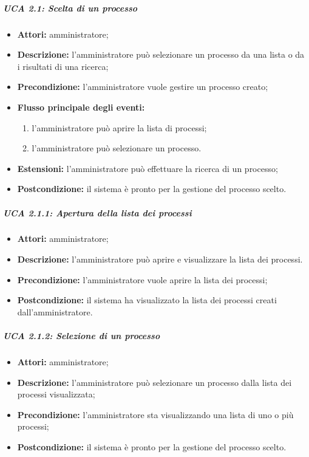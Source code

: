 \subparagraph{UCA 2.1: Scelta di un processo}
\begin{itemize}
\item \textbf{Attori:} amministratore;
\item \textbf{Descrizione:} l'amministratore può selezionare un processo da una lista o da i risultati di una ricerca;
\item \textbf{Precondizione:} l'amministratore vuole gestire un processo creato;
\item \textbf{Flusso principale degli eventi:}
\begin{enumerate}
\item l'amministratore può aprire la lista di processi;
\item l'amministratore può selezionare un processo.
\end{enumerate}
\item \textbf{Estensioni:} l'amministratore può effettuare la ricerca di un processo;
\item \textbf{Postcondizione:} il sistema è pronto per la gestione del processo scelto.
\end{itemize}

\subparagraph{UCA 2.1.1: Apertura della lista dei processi}
\begin{itemize}
\item \textbf{Attori:} amministratore;
\item \textbf{Descrizione:} l'amministratore può aprire e visualizzare la lista dei processi. 
\item \textbf{Precondizione:} l'amministratore vuole aprire la lista dei processi;
\item \textbf{Postcondizione:} il sistema ha visualizzato la lista dei processi creati dall'amministratore.
\end{itemize}

\subparagraph{UCA 2.1.2: Selezione di un processo}
\begin{itemize}
\item \textbf{Attori:} amministratore;
\item \textbf{Descrizione:} l'amministratore può selezionare un processo dalla lista dei processi visualizzata;
\item \textbf{Precondizione:} l'amministratore sta visualizzando una lista di uno o più processi;
\item \textbf{Postcondizione:} il sistema è pronto per la gestione del processo scelto.
\end{itemize}

